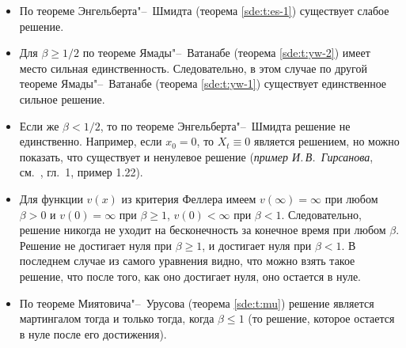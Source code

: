 \begin{itemize}
\item По теореме Энгельберта"--~Шмидта (теорема \ref{sde:t:es-1}) существует слабое решение.

\item Для $\beta\ge1/2$ по теореме Ямады"--~Ватанабе (теорема \ref{sde:t:yw-2}) имеет место сильная единственность.
Следовательно, в этом случае по другой теореме Ямады"--~Ватанабе (теорема \ref{sde:t:yw-1}) существует единственное сильное решение.

\item Если же $\beta< 1/2$, то по теореме Энгельберта"--~Шмидта решение не единственно.
Например, если $x_0=0$, то $X_t\equiv0$ является решением, но можно показать, что существует и ненулевое решение (\emph{пример И.\,В.~Гирсанова}, см.~\cite{ChernyEngelbert}, гл.~1, пример 1.22).

\item Для функции $v(x)$ из критерия Феллера имеем $v(\infty) = \infty$ при любом $\beta>0$ и $v(0) = \infty$ при $\beta\ge 1$, $v(0)<\infty$ при $\beta <1$.
Следовательно, решение никогда не уходит на бесконечность за конечное время при любом $\beta$.
Решение не достигает нуля при $\beta\ge1$, и достигает нуля при $\beta<1$.
В последнем случае из самого уравнения видно, что можно взять такое решение, что после того, как оно достигает нуля, оно остается в нуле.

\item По теореме Миятовича"--~Урусова (теорема \ref{sde:t:mu}) решение является мартингалом тогда и только тогда, когда $\beta\le 1$ (то решение, которое остается в нуле после его достижения).
\end{itemize}


